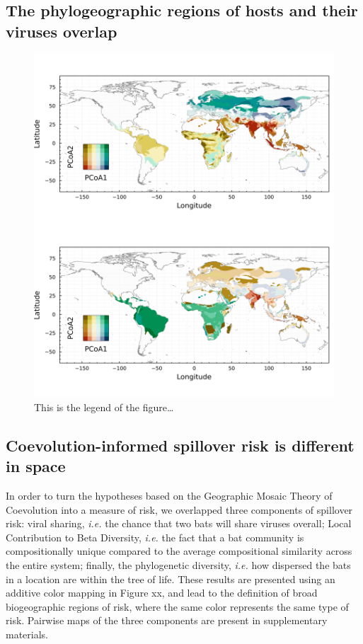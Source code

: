 \documentclass[10pt,oneside]{article}
\makeatletter
\def\maxwidth{\ifdim\Gin@nat@width>\linewidth\linewidth
\else\Gin@nat@width\fi}
\let\Oldincludegraphics\includegraphics
\renewcommand{\includegraphics}[1]{\Oldincludegraphics[width=\maxwidth]{#1}}
\makeatother
\begin{document}
\hypertarget{the-phylogeographic-regions-of-hosts-and-their-viruses-overlap}{%
\subsection{The phylogeographic regions of hosts and their viruses
overlap}\label{the-phylogeographic-regions-of-hosts-and-their-viruses-overlap}}

\begin{figure}
\hypertarget{fig:biogeo}{%
\centering
\includegraphics{figures/combined_biogeo.png}
\caption{This is the legend of the figure\ldots{}}\label{fig:biogeo}
}
\end{figure}

\hypertarget{coevolution-informed-spillover-risk-is-different-in-space}{%
\subsection{Coevolution-informed spillover risk is different in
space}\label{coevolution-informed-spillover-risk-is-different-in-space}}

In order to turn the hypotheses based on the Geographic Mosaic Theory of
Coevolution into a measure of risk, we overlapped three components of
spillover risk: viral sharing, \emph{i.e.} the chance that two bats will
share viruses overall; Local Contribution to Beta Diversity, \emph{i.e.}
the fact that a bat community is compositionally unique compared to the
average compositional similarity across the entire system; finally, the
phylogenetic diversity, \emph{i.e.} how dispersed the bats in a location
are within the tree of life. These results are presented using an
additive color mapping in Figure xx, and lead to the definition of broad
biogeographic regions of risk, where the same color represents the same
type of risk. Pairwise maps of the three components are present in
supplementary materials.
\end{document}
